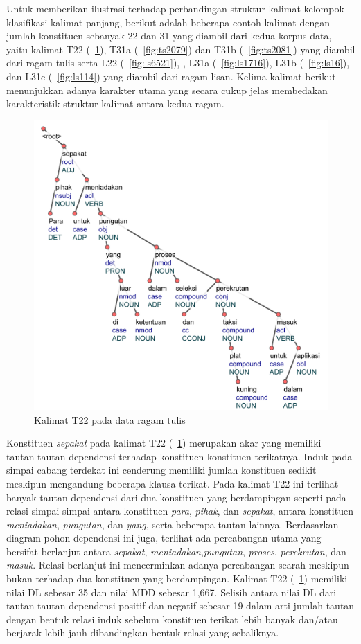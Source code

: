 Untuk memberikan ilustrasi terhadap perbandingan struktur kalimat kelompok klasifikasi kalimat panjang, berikut adalah beberapa contoh kalimat dengan jumlah konstituen sebanyak 22 dan 31 yang diambil dari kedua korpus data, yaitu kalimat T22 (\pic~\ref{fig:ts3901}), T31a (\pic~\ref{fig:ts2079}) dan T31b (\pic~\ref{fig:ts2081}) yang diambil dari ragam tulis serta L22 (\pic~\ref{fig:ls6521}), , L31a (\pic~\ref{fig:ls1716}), L31b (\pic~\ref{fig:ls16}), dan L31c (\pic~\ref{fig:ls114}) yang diambil dari ragam lisan. Kelima kalimat berikut menunjukkan adanya karakter utama yang secara cukup jelas membedakan karakteristik struktur kalimat antara kedua ragam. 

\begin{figure}
	\centering \includegraphics[width=0.8
	\textwidth] {pics/ts3901.jpg} 
	\caption{Kalimat T22 pada data ragam tulis} 
	\label{fig:ts3901} 
\end{figure}

Konstituen \textit{sepakat} pada kalimat T22 (\pic~\ref{fig:ts3901}) merupakan akar yang memiliki tautan-tautan dependensi terhadap konstituen-konstituen terikatnya. Induk pada simpai cabang terdekat ini cenderung memiliki jumlah konstituen sedikit meskipun mengandung beberapa klausa terikat. Pada kalimat T22 ini terlihat banyak tautan dependensi dari dua konstituen yang berdampingan seperti pada relasi simpai-simpai antara konstituen \textit{para}, \textit{pihak}, dan \textit{sepakat}, antara konstituen \textit{meniadakan}, \textit{pungutan}, dan \textit{yang}, serta beberapa tautan lainnya. Berdasarkan diagram pohon dependensi ini juga, terlihat ada percabangan utama yang bersifat berlanjut antara \textit{sepakat}, \textit{meniadakan},\textit{pungutan}, \textit{proses}, \textit{perekrutan}, dan \textit{masuk}. Relasi berlanjut ini mencerminkan adanya percabangan searah meskipun bukan terhadap dua konstituen yang berdampingan. Kalimat T22 (\pic~\ref{fig:ts3901}) memiliki nilai DL sebesar 35 dan nilai MDD sebesar 1,667. Selisih antara nilai DL dari tautan-tautan dependensi positif dan negatif sebesar 19 dalam arti jumlah tautan dengan bentuk relasi induk sebelum konstituen terikat lebih banyak dan/atau berjarak lebih jauh dibandingkan bentuk relasi yang sebaliknya.


